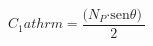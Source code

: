 \begin{equation}
\label{eq14}
C_1athrm{=}\frac{\mathrm{(}N_P\mathrm{\cdot }{\mathrm{sen} \theta \mathrm{)}\ }}{\mathrm{2}}
\end{equation}